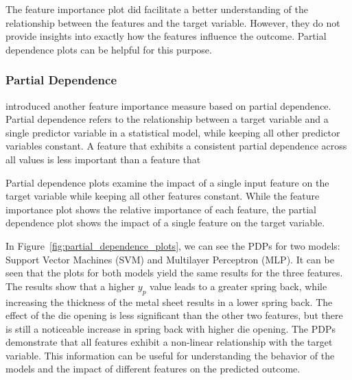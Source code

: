 The feature importance plot did facilitate a better understanding of the relationship between the features and the
target
variable.
However, they do not provide insights into exactly how the features influence the outcome. Partial dependence plots
can be helpful for this purpose.

\subsubsection{Partial Dependence}
\cite{greenwell2018simple} introduced another feature importance measure based on partial dependence.
Partial dependence refers to the relationship between a target variable and a single predictor variable in a statistical
model, while keeping all other predictor variables constant.
A feature that exhibits a consistent partial dependence across all values is less important than a feature that

Partial dependence plots examine the impact of a single input feature on the target variable while keeping all other
features constant.
While the feature importance plot shows the relative importance of each feature, the partial dependence plot shows
the impact of a single feature on the target variable.

In Figure~\ref{fig:partial_dependence_plots}, we can see the PDPs for two models: Support Vector Machines (SVM) and
Multilayer Perceptron (MLP).
It can be seen that the plots for both models yield the same results for the three features.
The results show that a higher $y_p$ value leads to a greater spring back, while
increasing the thickness of the metal sheet results in a lower spring back.
The effect of the die opening is less
significant than the other two features, but there is still a noticeable increase in spring back with higher die
opening.
The PDPs demonstrate that all features exhibit a non-linear relationship with the target variable.
This information
can be useful for understanding the behavior of the models and the impact of different features on the predicted
outcome.

